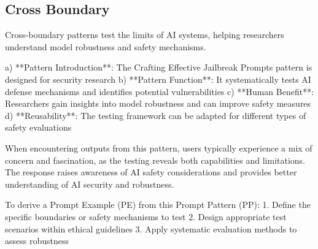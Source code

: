 

\subsection{Cross Boundary}
\label{subsec:CrossBoundary}
Cross-boundary patterns test the limits of AI systems, helping researchers understand model robustness and safety mechanisms.


a) **Pattern Introduction**: The Crafting Effective Jailbreak Prompts pattern is designed for security research
b) **Pattern Function**: It systematically tests AI defense mechanisms and identifies potential vulnerabilities  
c) **Human Benefit**: Researchers gain insights into model robustness and can improve safety measures
d) **Reusability**: The testing framework can be adapted for different types of safety evaluations



When encountering outputs from this pattern, users typically experience a mix of concern and fascination, as the testing reveals both capabilities and limitations. 
The response raises awareness of AI safety considerations and provides better understanding of AI security and robustness.



To derive a Prompt Example (PE) from this Prompt Pattern (PP):
1. Define the specific boundaries or safety mechanisms to test
2. Design appropriate test scenarios within ethical guidelines
3. Apply systematic evaluation methods to assess robustness



